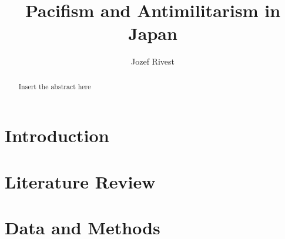 \documentclass{article}
\title{Pacifism and Antimilitarism in Japan}
\author{Jozef Rivest}
\date{ }
\begin{document}
\maketitle

\begin{abstract}
  Insert the abstract here
\end{abstract}

\section{Introduction}


\section{Literature Review}


\section{Data and Methods}
\end{document}
